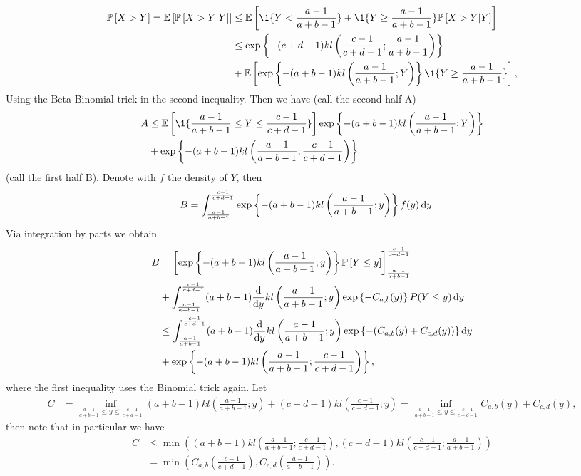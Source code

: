 	\begin{align*}
		\PP{X > Y} = \EE{ \PP{X > Y | Y}}
		&\leq \EE{\1{\{ Y < \frac{a-1}{a+b-1}  \} } + \1{\{ Y \geq \frac{a-1}{a+b-1} \} } \PP{X > Y | Y}  } \\
		&\leq \expp{- (c+d-1) kl\left(\frac{c-1}{c+d-1}; \frac{a-1}{a+b-1}\right) } \\
		&+ \EE{ \expp{-(a + b -1) kl\left(\frac{a-1}{a+b-1}; Y\right)}\1{\{ Y \geq \frac{a-1}{a+b-1} \} } },
	\end{align*}
	Using the Beta-Binomial trick in the second inequality.	Then we have (call the second half A)
	\begin{align*}
	A &\leq \EE{\1{\{ \frac{a-1}{a+b-1} \leq Y \leq \frac{c-1}{c+d-1}\}}}  \expp{-(a + b -1) kl\left(\frac{a-1}{a+b-1}; Y\right)}\\
	&+ \expp{-(a+b-1) kl\left( \frac{a-1}{a+b-1} ; \frac{c-1}{c+d-1} \right)}\\
	\end{align*}
	(call the first half B). Denote with $f$ the density of $Y$, then
	\begin{align*}
	B &= \int_{\frac{a-1}{a+b-1}}^{\frac{c-1}{c+d-1}} \exp\left\{-(a+b-1) kl\left( \frac{a-1}{a+b-1}; y\right)\right\} f(y) \mathop{}\!\mathrm{d}{y}.
	\end{align*}
	Via integration by parts we obtain
	\begin{align*}
	B &= \left[ \exp\left\{-(a+b-1) kl\left( \frac{a-1}{a+b-1}; y\right)\right\} \mathbb{P}\left[Y \leq y\right] \right]_{\frac{a-1}{a+b-1}}^{\frac{c-1}{c+d-1}}\\
	&+ \int_{\frac{a-1}{a+b-1}}^{\frac{c-1}{c+d-1}} (a+b-1) \frac{\operatorname{d}\!{}}{\operatorname{d}\!{y}} kl\left(\frac{a-1}{a+b-1} ; y\right) \exp\left\{-C_{a,b}(y) \right\} P(Y \leq y) \mathop{}\!\mathrm{d}{y}\\
	&\leq \int_{\frac{a-1}{a+b-1}}^{\frac{c-1}{c+d-1}} (a+b-1) \frac{\operatorname{d}\!{}}{\operatorname{d}\!{y}} kl\left(\frac{a-1}{a+b-1} ; y\right)
	\exp\left\{-(C_{a,b}(y)+C_{c,d}(y)) \right\} \mathop{}\!\mathrm{d}{y}\\
	&+ \exp\left\{-(a+b-1)kl\left(\frac{a-1}{a+b-1}; \frac{c-1}{c+d-1}\right)\right\},
	\end{align*}
	where the first inequality uses the Binomial trick again. Let
	\begin{align*}
	C &= \inf_{\frac{a-1}{a+b-1} \leq y \leq \frac{c-1}{c+d-1}} (a+b-1) kl\left(\frac{a-1}{a+b-1}; y\right) + (c+d-1) kl\left(\frac{c-1}{c+d-1} ; y\right)  = \inf_{\frac{a-1}{a+b-1} \leq y \leq \frac{c-1}{c+d-1}} C_{a,b}(y)+C_{c,d}(y),
	\end{align*}
	then note that in particular we have
	\begin{align*}
	C &\leq \min \left( (a+b-1) kl\left(\frac{a-1}{a+b-1}; \frac{c-1}{c+d-1}\right), (c+d-1) kl \left(\frac{c-1}{c+d-1} ; \frac{a-1}{a+b-1}\right) \right)\\
	  &= \min \left(C_{a,b}\left(\frac{c-1}{c+d-1}\right), C_{c,d}\left(\frac{a-1}{a+b-1}\right)\right).
	\end{align*}
